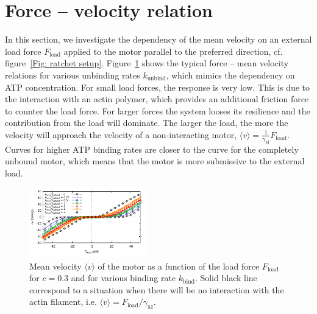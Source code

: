 \documentclass[aps,pre,twocolumn,showpacs,showkeys]{revtex4-1}
\begin{document}
\section{Force -- velocity relation}
\label{sec:force-velocity}
In this section, we investigate the dependency of the mean velocity on an external load force $F_\text{load}$ applied to the motor parallel to the preferred direction, 
cf. figure~\ref{Fig: ratchet setup}.
Figure~\ref{Fig: F_v} shows the typical force -- mean velocity relations for various unbinding rates $k_\text{unbind}$, which mimics the dependency on ATP concentration.
For small load forces, the response is very low. 
This is due to the interaction with an actin polymer, which provides an additional friction force to counter the load force. 
For larger forces the system looses its resilience and the contribution from the load will dominate. 
The larger the load, the more the velocity will approach the velocity of a non-interacting motor, $\langle v \rangle = \frac{1}{\gamma_\text{M}}F_\text{load}$.
Curves for higher ATP binding rates are closer to the curve for the completely unbound motor, %
which means that the motor is more submissive to the external load.
\begin{figure}[t]
\centering
\includegraphics[width=0.45\textwidth,height=!]{F_v}
\caption{Mean velocity $\langle v \rangle$ of the motor as a function of the load force $F_\text{load}$ for $c=0.3$ and for various binding rate $k_\text{bind}$.
Solid black line correspond to a situation when there will be no interaction with the actin filament, i.e. $\langle v \rangle = F_\text{load} / \gamma_\text{M}$. 
}
\label{Fig: F_v} 
\end{figure}
\end{document}

